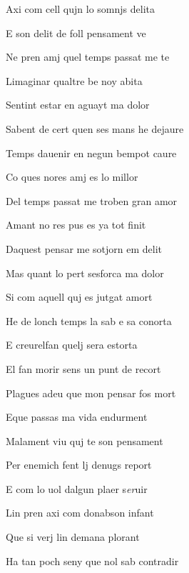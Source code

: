 





\begin{estrofa}

 {\LARGE A}xi com cell qujn lo somnjs delita

 E son delit de foll pensament ve

 Ne pren amj quel temps passat me te

 Limaginar qualtre be noy abita

 Sentint estar en aguayt ma dolor

 Sabent de cert quen ses mans he dejaure

 Temps dauenir en negun bempot caure

 Co ques nores amj es lo millor

\end{estrofa}



\begin{estrofa}

 Del temps passat me troben gran amor

 Amant no res pus es ya tot finit

 Daquest pensar me sotjorn em delit

 Mas quant lo pert sesforca ma dolor

 Si com aquell quj es jutgat amort

 He de lonch temps la sab e sa conorta

 E creurelfan quelj sera estorta

 El fan morir sens un punt de recort

\end{estrofa}



\begin{estrofa}

 Plagues adeu que mon pensar fos mort

 Eque passas ma vida endurment

 Malament viu quj te son pensament

 Per enemich fent lj denugs report

 E com lo uol dalgun plaer s\textit{er}uir

 Lin pren axi com donabson infant

 Que si verj lin demana plorant

 Ha tan poch seny que nol sab contradir

\end{estrofa}


